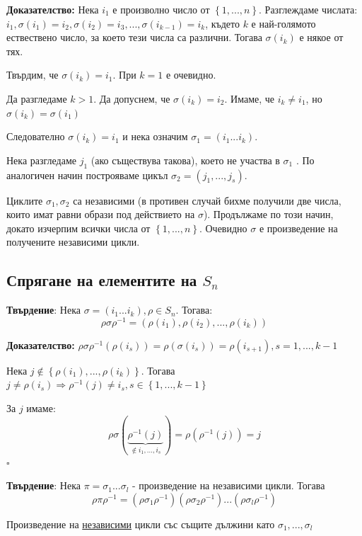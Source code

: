 \documentclass{article}
\renewcommand{\\}{\newline}
\newcommand{\doc}{\textbf{Доказателство: }}
\newcommand{\proven}{\hfill $\square$}
\begin{document}
\doc Нека \(i_1\) е произволно число от \(\left\{1,...,n\right\}\). Разглеждаме числата: \(i_1, \sigma(i_1) = i_2, \sigma(i_2) = i_3,..., \sigma(i_{k-1}) = i_k\), където \(k\) е най-голямото ествествено число, за което тези числа са различни. Тогава \(\sigma(i_k)\) е някое от тях. 

Твърдим, че \(\sigma(i_k) = i_1\). При \(k=1\) е очевидно. 

Да разгледаме \(k > 1\). Да допуснем, че \(\sigma(i_k) = i_2\). Имаме, че \(i_k \not= i_1\), но \(\sigma(i_k) = \sigma(i_1)\) \Lightning

Следователно \(\sigma(i_k) = i_1\) и нека означим \(\sigma_1 = (i_1...i_k)\). 

Нека разгледаме \(j_1\) (ако съществува такова), което не участва в \(\sigma_1\) . По аналогичен начин построяваме цикъл \(\sigma_2 = (j_1,...,j_s)\).

Циклите \(\sigma_1, \sigma_2\) са независими (в противен случай бихме получили две числа, които имат равни образи под действието на \(\sigma\)). Продължаме по този начин, докато изчерпим всички числа от \(\left\{1,...,n\right\}\). Очевидно \(\sigma\) е произведение на получените независими цикли.

\subsection{Спрягане на елементите на \(S_n\)}

\textbf{Твърдение}: Нека \(\sigma = (i_1...i_k), \rho \in S_n\). Тогава: \[
  \rho \sigma \rho^{-1} = \left(\rho(i_1), \rho(i_2),..., \rho(i_k)\right)
\]  

\doc \(\rho \sigma \rho^{-1}(\rho(i_s)) = \rho(\sigma(i_s)) = \rho(i_{s+1}), s = 1,...,k-1\)  

Нека \(j \not\in \left\{\rho(i_1), ..., \rho(i_k)\right\}\). Тогава \(j \not= \rho(i_s) \Rightarrow \rho^{-1}(j) \not= i_s, s \in \left\{1,...,k-1\right\} \)   

За \(j\) имаме: \[
  \rho \sigma (\underbrace{\rho^{-1}(j)}_{\not\in {i_1,...,i_s}}) = \rho(\rho^{-1}(j)) = j 
\] \proven 

\textbf{Твърдение}: Нека \(\pi = \sigma_1...\sigma_l\) - произведение на независими цикли. Тогава \[
  \rho \pi \rho^{-1} = \left(\rho \sigma_1 \rho^{-1}\right)\left(\rho \sigma_2 \rho^{-1}\right)...\left(\rho \sigma_l \rho^{-1}\right)
\] 

Произведение на \underline{независими} цикли със същите дължини като \(\sigma_1, ..., \sigma_l\)
\end{document}
